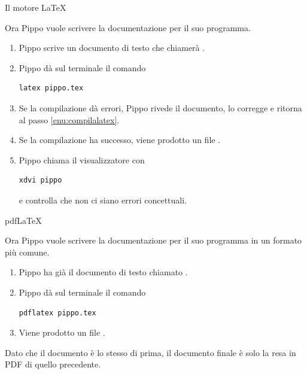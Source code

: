 \documentclass{beamer}
\begin{document}
\begin{frame}[fragile]{\insertsubsection{} Il motore \LaTeX}

Ora Pippo vuole scrivere la documentazione per il suo programma.
\bigskip
\begin{enumerate}
\item Pippo scrive un documento di testo che chiamer\`a .
\item \label{enu:compilalatex}Pippo d\`a sul terminale il comando

\begin{verbatim}
latex pippo.tex
\end{verbatim}

\item Se la compilazione d\`a errori, Pippo rivede il documento, lo corregge
e ritorna al passo \ref{enu:compilalatex}.
\item Se la compilazione ha successo, viene prodotto un file .
\item Pippo chiama il visualizzatore con

\begin{verbatim}
xdvi pippo
\end{verbatim}

e controlla che non ci siano errori concettuali.
\end{enumerate}
\end{frame}

\begin{frame}[fragile]{\insertsubsection{} pdf\LaTeX}

Ora Pippo vuole scrivere la documentazione per il suo programma in
un formato pi\`u comune.
\bigskip
\begin{enumerate}
\item Pippo ha gi\`a il documento di testo chiamato .
\item Pippo d\`a sul terminale il comando
\begin{verbatim}
pdflatex pippo.tex
\end{verbatim}
\item Viene prodotto un file .
\end{enumerate}
\bigskip
Dato che il documento  \`e lo stesso di prima,
il documento finale \`e solo la resa in PDF di quello precedente.
\end{frame}
\end{document}

